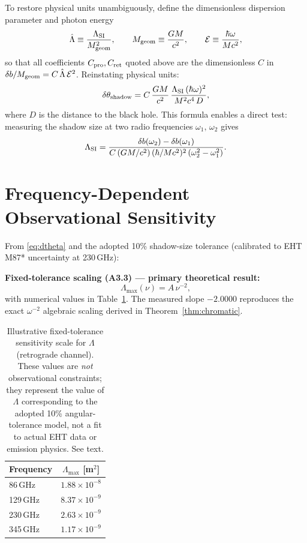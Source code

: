 \documentclass[12pt,a4paper]{article}
\begin{document}
To restore physical units unambiguously, define the dimensionless
dispersion parameter and photon energy
\begin{equation}
  \hat\Lambda \equiv \frac{\Lambda_{\rm SI}}{M_{\rm geom}^2},
  \qquad
  M_{\rm geom}\equiv\frac{GM}{c^2},
  \qquad
  \mathcal{E}\equiv\frac{\hbar\omega}{Mc^2},
\end{equation}
so that all coefficients $C_{\rm pro},C_{\rm ret}$ quoted above are the
dimensionless $C$ in $\delta b/M_{\rm geom}=C\,\hat\Lambda\,\mathcal{E}^2$.
Reinstating physical units:
\begin{equation}\label{eq:dtheta}
  \delta\theta_{\rm shadow} = C\,\frac{GM}{c^2}\,
  \frac{\Lambda_{\rm SI}\,(\hbar\omega)^2}{M^2c^4\,D},
\end{equation}
where $D$ is the distance to the black hole.
This formula enables a direct test: measuring the shadow size at two
radio frequencies $\omega_1,\,\omega_2$ gives
\begin{equation}
  \Lambda_{\rm SI} = \frac{\delta b(\omega_2)-\delta b(\omega_1)}
    {C\,(GM/c^2)\,(\hbar/Mc^2)^2\,(\omega_2^2-\omega_1^2)}.
\end{equation}

\section{Frequency-Dependent Observational Sensitivity}
\label{sec:constraints}

From \eqref{eq:dtheta} and the adopted 10\% shadow-size tolerance
(calibrated to EHT M87* uncertainty at 230\,GHz):

\textbf{Fixed-tolerance scaling (A3.3) --- primary theoretical result:}
\begin{equation}
  \Lambda_{\max}(\nu) = A\,\nu^{-2},
\end{equation}
with numerical values in Table~\ref{tab:lmax}.
The measured slope $-2.0000$ reproduces the exact $\omega^{-2}$ algebraic
scaling derived in Theorem~\ref{thm:chromatic}.

\begin{table}[h]
\centering
\caption{Illustrative fixed-tolerance sensitivity scale for $\Lambda$
(retrograde channel). These values are \emph{not} observational
constraints; they represent the value of $\Lambda$ corresponding to
the adopted 10\% angular-tolerance model, not a fit to actual EHT data
or emission physics. See text.}
\label{tab:lmax}
\begin{tabular}{lc}
\toprule
Frequency & $\Lambda_{\max}$ [m$^2$] \\
\midrule
86\,GHz  & $1.88\times10^{-8}$ \\
129\,GHz & $8.37\times10^{-9}$ \\
230\,GHz & $2.63\times10^{-9}$ \\
345\,GHz & $1.17\times10^{-9}$ \\
\bottomrule
\end{tabular}
\end{table}
\end{document}
